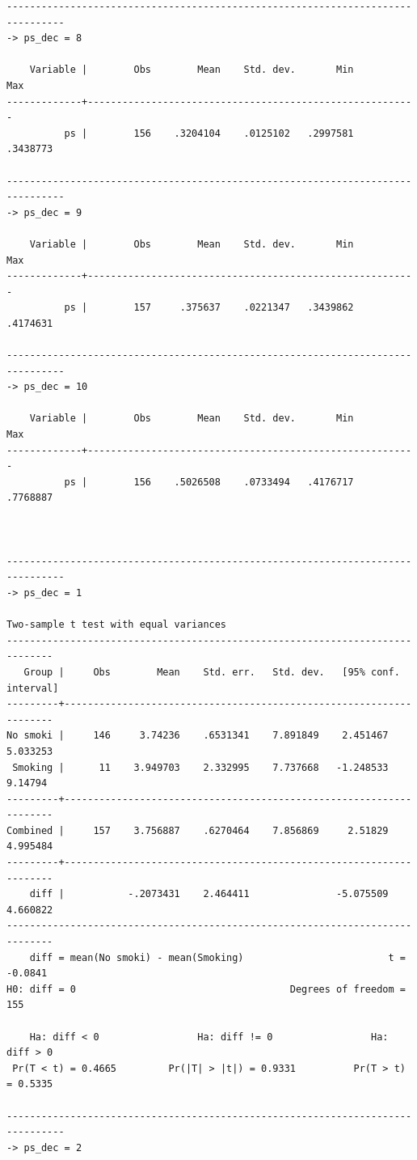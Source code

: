 \documentclass[
  10pt,
]{book}
\begin{document}
\begin{verbatim}
--------------------------------------------------------------------------------
-> ps_dec = 8

    Variable |        Obs        Mean    Std. dev.       Min        Max
-------------+---------------------------------------------------------
          ps |        156    .3204104    .0125102   .2997581   .3438773

--------------------------------------------------------------------------------
-> ps_dec = 9

    Variable |        Obs        Mean    Std. dev.       Min        Max
-------------+---------------------------------------------------------
          ps |        157     .375637    .0221347   .3439862   .4174631

--------------------------------------------------------------------------------
-> ps_dec = 10

    Variable |        Obs        Mean    Std. dev.       Min        Max
-------------+---------------------------------------------------------
          ps |        156    .5026508    .0733494   .4176717   .7768887



--------------------------------------------------------------------------------
-> ps_dec = 1

Two-sample t test with equal variances
------------------------------------------------------------------------------
   Group |     Obs        Mean    Std. err.   Std. dev.   [95% conf. interval]
---------+--------------------------------------------------------------------
No smoki |     146     3.74236    .6531341    7.891849    2.451467    5.033253
 Smoking |      11    3.949703    2.332995    7.737668   -1.248533     9.14794
---------+--------------------------------------------------------------------
Combined |     157    3.756887    .6270464    7.856869     2.51829    4.995484
---------+--------------------------------------------------------------------
    diff |           -.2073431    2.464411               -5.075509    4.660822
------------------------------------------------------------------------------
    diff = mean(No smoki) - mean(Smoking)                         t =  -0.0841
H0: diff = 0                                     Degrees of freedom =      155

    Ha: diff < 0                 Ha: diff != 0                 Ha: diff > 0
 Pr(T < t) = 0.4665         Pr(|T| > |t|) = 0.9331          Pr(T > t) = 0.5335

--------------------------------------------------------------------------------
-> ps_dec = 2


\end{verbatim}
\end{document}
